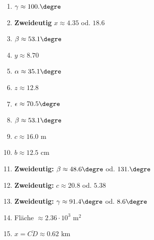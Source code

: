 \begin{minipage}[t]{0.45\textwidth}
\begin{enumerate}[resume=loesungen]
    \item $\gamma \approx 100.\degre$
    \item \textbf{Zweideutig}  $x \approx 4.35$ od. $18.6$
    \item $\beta \approx 53.1\degre$
    \item $y \approx 8.70$
    \item $\alpha \approx 35.1\degre$
    \item $z \approx 12.8$
    \item $\epsilon \approx 70.5\degre$
    \item $\beta \approx 53.1\degre$
    \item $c \approx 16.0$ m
    \item $b \approx 12.5$ cm
    \item \textbf{Zweideutig:}  $\beta \approx 48.6\degre$ od. $131.\degre$
    \item \textbf{Zweideutig:} $c \approx 20.8$ od. $5.38$
    \item \textbf{Zweideutig:} $\gamma \approx 91.4\degre$
    od. $8.6\degre$
    \item Fläche $\approx 2.36 \cdot{} 10^3 \text{ m}^2$
    \item $x = \overline{CD} \approx 0.62$ km
\end{enumerate}
\end{minipage}


%
